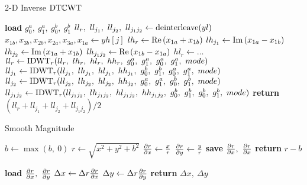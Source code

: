 \begin{algorithm}[tb]
\caption{2-D Inverse $\mathrm{DT}\mathbb{C}\mathrm{WT}$}\label{alg:appB:idtcwt}
\begin{algorithmic}[1]
\State \textbf{load} $g_0^a,\ g_1^a,\ g_0^b,\ g_1^b$ 
\State $ll_{r},\ ll_{j_1},\ ll_{j_2},\ ll_{j_1j_2} \gets \mathrm{deinterleave}(yl)$
\State $x_{1b},x_{3b}, x_{2b}, x_{2a}, x_{3a}, x_{1a} \gets yh[j] $
\State $lh_{r} \gets \mathrm{Re}\left(x_{1a} + x_{1b}\right)$
\State $lh_{j_1} \gets \mathrm{Im}\left(x_{1a} - x_{1b}\right)$
\State $lh_{j_2} \gets \mathrm{Im}\left(x_{1a} + x_{1b}\right)$
\State $lh_{j_1j_2} \gets \mathrm{Re}\left(x_{1b} - x_{1a}\right)$
\State $hl_{r} \gets \ldots $ 
\State $ll_{r} \gets \F{IDWT}_r(ll_{r},\ lh_{r},\ hl_{r},\ hh_{r},\ g_0^a,\ g_1^a,\ g_0^a,\ g_1^a,\ mode)$
\State $ll_{j_1} \gets \F{IDWT}_r(ll_{j_1},\ lh_{j_1},\ hl_{j_1},\ hh_{j_1},\ g_0^b,\ g_1^b,\ g_0^a,\ g_1^a,\ mode)$
\State $ll_{j_2} \gets \F{IDWT}_r(ll_{j_2},\ lh_{j_2},\ hl_{j_2},\ hh_{j_2},\ g_0^a,\ g_1^a,\ g_0^b,\ g_1^b,\ mode)$
\State $ll_{j_1j_2} \gets \F{IDWT}_r(ll_{j_1j_2},\ lh_{j_1j_2},\ hl_{j_1j_2},\ hh_{j_1j_2},\ g_0^b,\ g_1^b,\ g_0^b,\ g_1^b,\ mode)$
\EndFor
\State \textbf{return} $\left(ll_{r} + ll_{j_1} + ll_{j_2} + ll_{j_1j_2}\right)/2$
\EndFunction
\end{algorithmic}
\end{algorithm}

\begin{algorithm}[tb]
\caption{Smooth Magnitude}\label{alg:appB:mag_smooth}
\begin{algorithmic}[1]
  \State $b \gets \max(b,\ 0)$
  \State $r \gets \sqrt{x^2 + y^2 + b^2}$
  \State $\frac{\partial r}{\partial x} \gets \frac{x}{r}$
  \State $\frac{\partial r}{\partial y} \gets \frac{y}{r}$
  \State \textbf{save} $\dydx{r}{x},\ \dydx{r}{x}$
  \State \textbf{return} $r - b$
\EndFunction
\end{algorithmic}\vspace{10pt}
\begin{algorithmic}[1]
  \State \textbf{load} $\dydx{r}{x},\ \dydx{r}{y}$
  \State $\Delta x \gets \Delta r \frac{\partial r}{\partial x}$
  \State $\Delta y \gets \Delta r \frac{\partial r}{\partial y}$
  \State \textbf{return} $\Delta x,\ \Delta y$
\EndFunction
\end{algorithmic}
\end{algorithm}

